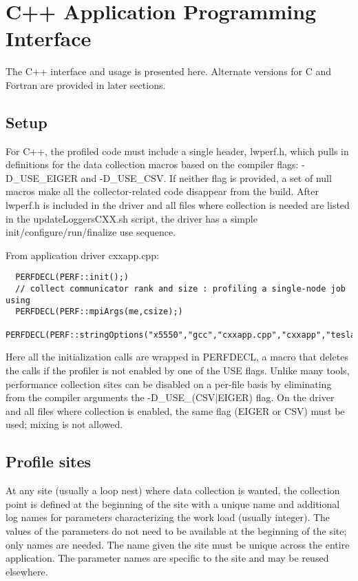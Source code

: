 
\chapter{C++ Application Programming Interface}\label{sec:api}
The C++ interface and usage is presented here. Alternate versions for C and Fortran are provided in later sections.
\section{Setup}
For C++, the profiled code must include a single header, lwperf.h, which pulls in definitions for the data collection macros based on the compiler flags: -D\_USE\_EIGER and -D\_USE\_CSV. If neither flag is provided, a set of null macros make all the collector-related code disappear from the build.
After lwperf.h is included in the driver and all files where collection is needed are listed in the updateLoggersCXX.sh script, the driver has a simple init/configure/run/finalize use sequence.

From application driver cxxapp.cpp:
\begin{verbatim}
  PERFDECL(PERF::init();)
  // collect communicator rank and size : profiling a single-node job using
  PERFDECL(PERF::mpiArgs(me,csize);)
  PERFDECL(PERF::stringOptions("x5550","gcc","cxxapp.cpp","cxxapp","tesla.",".log");)
\end{verbatim}
Here all the initialization calls are wrapped in PERFDECL, a macro that deletes the calls if the profiler is not enabled by one of the USE flags. Unlike many tools, performance collection sites can be disabled on a per-file basis by eliminating from the compiler arguments the -D\_USE\_(CSV|EIGER) flag. On the driver and all files where collection is enabled, the same flag (EIGER or CSV) must be used; mixing is not allowed.

\section{Profile sites}
At any site (usually a loop nest) where data collection is wanted, the collection point is defined at the beginning of the site with a unique name and additional log names for parameters characterizing the work load (usually integer). The values of the parameters do not need to be available at the beginning of the site; only names are needed. The name given the site must be unique across the entire application. The parameter names are specific to the site and may be reused elsewhere.

